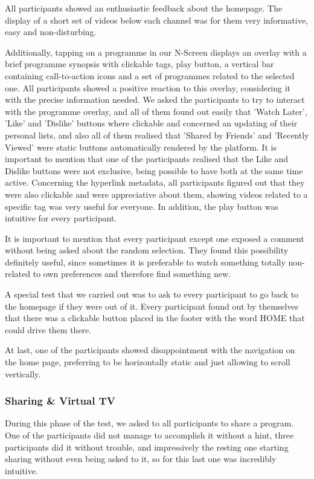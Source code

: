 \documentclass{acm_proc_article-sp}
\begin{document}
All participants showed an enthusiastic feedback about the homepage. The display of a short set of videos below each channel was for them very informative, easy and non-disturbing. 

Additionally, tapping on a programme in our N-Screen displays an overlay with a brief programme synopsis with clickable tags, play button, a vertical bar containing call-to-action icons and a set of programmes related to the selected one. All participants showed a positive reaction to this overlay, considering it with the precise information needed. We asked the participants to try to interact with the programme overlay, and all of them found out easily that 'Watch Later', 'Like' and 'Dislike' buttons where clickable and concerned an updating of their personal lists, and also all of them realised that 'Shared by Friends' and 'Recently Viewed' were static buttons automatically rendered by the platform. It is important to mention that one of the participants realised that the Like and Dislike buttons were not exclusive, being possible to have both at the same time active. Concerning the hyperlink metadata, all participants figured out that they were also clickable and were appreciative about them, showing videos related to a specific tag was very useful for everyone.  In addition, the play button was intuitive for every participant.  

It is important to mention that every participant except one exposed a comment without being asked about the random selection. They found this possibility definitely useful, since sometimes it is preferable to watch something totally non-related to own preferences and therefore find something new. 

A special test that we carried out was to ask to every participant to go back to the homepage if they were out of it. Every participant found out by themselves that there was a clickable button placed in the footer with the word HOME that could drive them there. 

At last, one of the participants showed disappointment with the navigation on the home page, preferring to be horizontally static and just allowing to scroll vertically. 
\subsubsection{Sharing \& Virtual TV}
 
During this phase of the test, we asked to all participants to share a program. One of the participants did not manage to accomplish it without a hint, three participants did it without trouble, and impressively the resting one starting sharing without even being asked to it, so for this last one was incredibly intuitive. 
\end{document}
